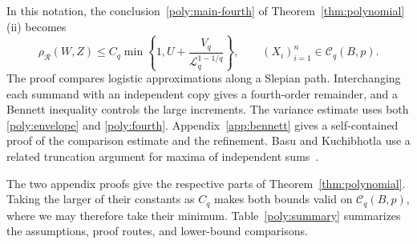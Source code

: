 \documentclass[11pt,letterpaper]{article}
\newenvironment{recovered}{}{}
\theoremstyle{remark}
\newcommand{\rh}{\rho_{\mathcal R}}
\begin{document}
\begin{recovered}
In this notation, the conclusion~\eqref{poly:main-fourth} of
Theorem~\ref{thm:polynomial}\textup{(ii)} becomes
\begin{equation}
 \rh(W,Z)\le C_q\min\left\{1,
 U+\frac{V_q}{\mathcal L_q^{1-1/q}}\right\},
 \qquad (X_i)_{i=1}^n\in\mathcal C_q(B,p).
 \label{poly:bennett-bound}
\end{equation}
The proof compares logistic approximations along a Slepian path.
Interchanging each summand with an independent copy gives a
fourth-order remainder, and a Bennett inequality controls the large
increments. The variance estimate uses both \eqref{poly:envelope}
and \eqref{poly:fourth}. Appendix~\ref{app:bennett} gives a
self-contained proof of the comparison estimate and the refinement.
\end{recovered}
Basu and Kuchibhotla use a related truncation
argument for maxima of independent sums~\cite[Proposition~4.2]{BK2025}.

\begin{recovered}
The two appendix proofs give the respective parts of
Theorem~\ref{thm:polynomial}. Taking the larger of their constants
as \(C_q\) makes both bounds valid on \(\mathcal C_q(B,p)\),
where we may therefore take their minimum. Table~\ref{poly:summary}
summarizes the assumptions, proof routes, and lower-bound comparisons.
\end{recovered}
\end{document}
